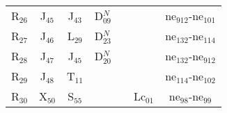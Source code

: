 \begin{table}[H]
{{\begin{tabular}{ c c c c c c c }
                    R$_{26}$ & J$_{45}$ & J$_{43}$ & D$_{09}^{N}$ &  &  & ne$_{912}$-ne$_{101}$\\
                    R$_{27}$ & J$_{46}$ & L$_{29}$ & D$_{23}^{N}$ &  &  & ne$_{132}$-ne$_{114}$\\
                    R$_{28}$ & J$_{47}$ & J$_{45}$ & D$_{20}^{N}$ &  &  & ne$_{132}$-ne$_{912}$\\
                    R$_{29}$ & J$_{48}$ & T$_{11}$ &  &  &  & ne$_{114}$-ne$_{102}$\\
                    R$_{30}$ & X$_{50}$ & S$_{55}$ &  &  & Lc$_{01}$ & ne$_{98}$-ne$_{99}$\\
                \hline
            \end{tabular}
        }
     }
    \end{table}

	
